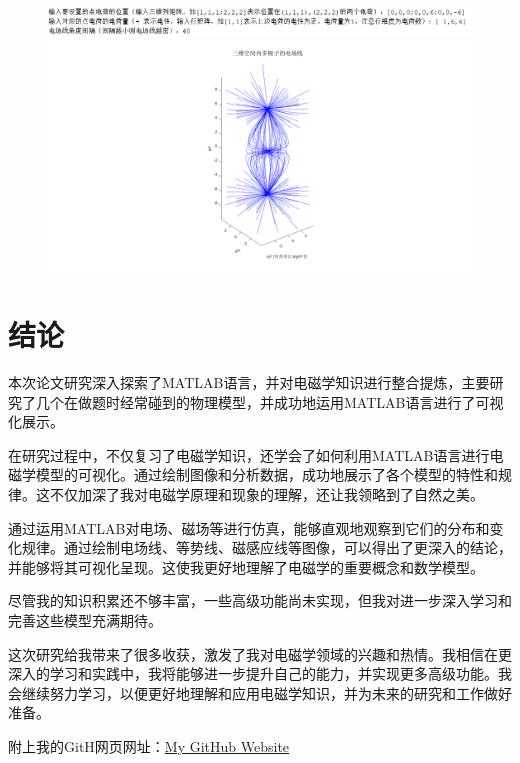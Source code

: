 \documentclass[UTF8]{article}
\numberwithin{figure}{subsection}
\numberwithin{table}{subsection}
\begin{document}
\begin{multicols}{2}
\begin{figure}[H]
	\end{figure}
	\begin{figure}[H]
		\centering
		\includegraphics[scale=0.4]{ceshi6.png}
	\includegraphics[scale=0.15]{测试6.png}
	\end{figure}
    \section{结论}
    \par 本次论文研究深入探索了MATLAB语言，并对电磁学知识进行整合提炼，主要研究了几个在做题时经常碰到的物理模型，并成功地运用MATLAB语言进行了可视化展示。
    \par 在研究过程中，不仅复习了电磁学知识，还学会了如何利用MATLAB语言进行电磁学模型的可视化。通过绘制图像和分析数据，成功地展示了各个模型的特性和规律。这不仅加深了我对电磁学原理和现象的理解，还让我领略到了自然之美。
    \par 通过运用MATLAB对电场、磁场等进行仿真，能够直观地观察到它们的分布和变化规律。通过绘制电场线、等势线、磁感应线等图像，可以得出了更深入的结论，并能够将其可视化呈现。这使我更好地理解了电磁学的重要概念和数学模型。
    \par 尽管我的知识积累还不够丰富，一些高级功能尚未实现，但我对进一步深入学习和完善这些模型充满期待。
    \par 这次研究给我带来了很多收获，激发了我对电磁学领域的兴趣和热情。我相信在更深入的学习和实践中，我将能够进一步提升自己的能力，并实现更多高级功能。我会继续努力学习，以便更好地理解和应用电磁学知识，并为未来的研究和工作做好准备。
    \par 附上我的GitH网页网址：\href{https://github.com/chenxinqi041027/chenxinqi041027.github.io}{My GitHub Website}
\end{multicols}
\end{document}

